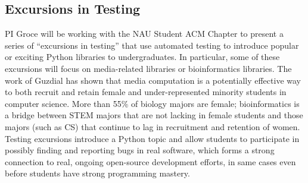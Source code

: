 \subsection{Excursions in Testing}

PI Groce will be working with the NAU Student ACM Chapter to present a
series of ``excursions in testing'' that use automated testing to
introduce popular or exciting Python libraries to undergraduates.  In
particular, some of these excursions will focus on media-related
libraries or bioinformatics libraries.  The work of Guzdial
\cite{Guzdial} has shown that media computation is a
potentially effective way to both recruit and retain female and
under-represented minority students in computer science.
More than 55\% of biology majors are female; bioinformatics is a
bridge between STEM majors that are not lacking in female students and
those majors (such as CS) that continue to lag in recruitment and
retention of women.  Testing excursions introduce a Python topic and
allow students to participate in possibly finding and reporting bugs
in real software, which forms a strong connection to real, ongoing
open-source development efforts, in same cases even before students
have strong programming mastery.



